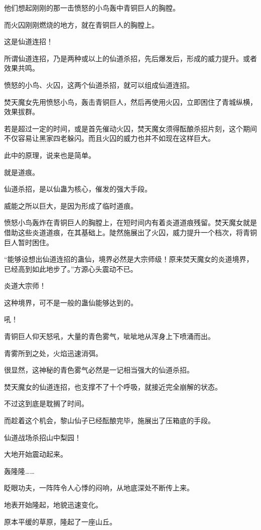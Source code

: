 \begin{this_body}
他们想起刚刚的那一击愤怒的小鸟轰中青铜巨人的胸膛。

而火囚刚刚燃烧的地方，就在青铜巨人的胸膛上。

这是仙道连招！

所谓仙道连招，乃是两种或以上的仙道杀招，先后爆发后，形成的威力提升。或者效果共鸣。

愤怒的小鸟、火囚，这两个仙道杀招，就可以组成仙道连招。

焚天魔女先用愤怒小鸟，轰击青铜巨人，然后再使用火囚，立即困住了青城纵横，效果拔群。

若是超过一定的时间，或是首先催动火囚，焚天魔女须得酝酿杀招片刻，这个期间不仅容易让黑家四老躲闪。而且火囚的威力也并不如现在这样巨大。

此中的原理，说来也是简单。

就是道痕。

仙道杀招，是以仙蛊为核心，催发的强大手段。

威能之所以巨大，是因为形成了临时道痕。

愤怒小鸟轰炸在青铜巨人的胸膛上，在短时间内有着炎道道痕残留。焚天魔女就是借助这些炎道道痕，在其基础上。陡然施展出了火囚，威力提升一个档次，将青铜巨人暂时困住。

“能够设想出仙道连招的蛊仙，境界必然是大宗师级！原来焚天魔女的炎道境界，已经高到如此地步了。”方源心头震动不已。

炎道大宗师！

这种境界，可不是一般的蛊仙能够达到的。

吼！

青铜巨人仰天怒吼，大量的青色雾气，呲呲地从浑身上下喷涌而出。

青雾所到之处，火焰迅速消弭。

很显然，这神秘的青色雾气必然是一记相当强大的仙道杀招。

焚天魔女的仙道连招，也支撑不了十个呼吸，就接近完全崩解的状态。

不过这到底是耽搁了时间。

而趁着这个机会，黎山仙子已经酝酿完毕，施展出了压箱底的手段。

仙道战场杀招山中梨园！

大地开始震动起来。

轰隆隆……

眨眼功夫，一阵阵令人心悸的闷响，从地底深处不断传上来。

地表开始隆起，地貌迅速变化。

原本平缓的草原，隆起了一座山丘。


\end{this_body}
